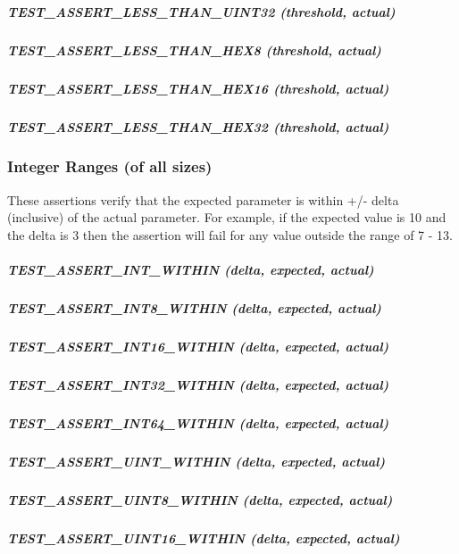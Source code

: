 \subparagraph*{{\ttfamily T\+E\+S\+T\+\_\+\+A\+S\+S\+E\+R\+T\+\_\+\+L\+E\+S\+S\+\_\+\+T\+H\+A\+N\+\_\+\+U\+I\+N\+T32 (threshold, actual)}}

\subparagraph*{{\ttfamily T\+E\+S\+T\+\_\+\+A\+S\+S\+E\+R\+T\+\_\+\+L\+E\+S\+S\+\_\+\+T\+H\+A\+N\+\_\+\+H\+E\+X8 (threshold, actual)}}

\subparagraph*{{\ttfamily T\+E\+S\+T\+\_\+\+A\+S\+S\+E\+R\+T\+\_\+\+L\+E\+S\+S\+\_\+\+T\+H\+A\+N\+\_\+\+H\+E\+X16 (threshold, actual)}}

\subparagraph*{{\ttfamily T\+E\+S\+T\+\_\+\+A\+S\+S\+E\+R\+T\+\_\+\+L\+E\+S\+S\+\_\+\+T\+H\+A\+N\+\_\+\+H\+E\+X32 (threshold, actual)}}

\subsubsection*{Integer Ranges (of all sizes)}

These assertions verify that the {\ttfamily expected} parameter is within +/-\/ {\ttfamily delta} (inclusive) of the {\ttfamily actual} parameter. For example, if the expected value is 10 and the delta is 3 then the assertion will fail for any value outside the range of 7 -\/ 13.

\subparagraph*{{\ttfamily T\+E\+S\+T\+\_\+\+A\+S\+S\+E\+R\+T\+\_\+\+I\+N\+T\+\_\+\+W\+I\+T\+H\+IN (delta, expected, actual)}}

\subparagraph*{{\ttfamily T\+E\+S\+T\+\_\+\+A\+S\+S\+E\+R\+T\+\_\+\+I\+N\+T8\+\_\+\+W\+I\+T\+H\+IN (delta, expected, actual)}}

\subparagraph*{{\ttfamily T\+E\+S\+T\+\_\+\+A\+S\+S\+E\+R\+T\+\_\+\+I\+N\+T16\+\_\+\+W\+I\+T\+H\+IN (delta, expected, actual)}}

\subparagraph*{{\ttfamily T\+E\+S\+T\+\_\+\+A\+S\+S\+E\+R\+T\+\_\+\+I\+N\+T32\+\_\+\+W\+I\+T\+H\+IN (delta, expected, actual)}}

\subparagraph*{{\ttfamily T\+E\+S\+T\+\_\+\+A\+S\+S\+E\+R\+T\+\_\+\+I\+N\+T64\+\_\+\+W\+I\+T\+H\+IN (delta, expected, actual)}}

\subparagraph*{{\ttfamily T\+E\+S\+T\+\_\+\+A\+S\+S\+E\+R\+T\+\_\+\+U\+I\+N\+T\+\_\+\+W\+I\+T\+H\+IN (delta, expected, actual)}}

\subparagraph*{{\ttfamily T\+E\+S\+T\+\_\+\+A\+S\+S\+E\+R\+T\+\_\+\+U\+I\+N\+T8\+\_\+\+W\+I\+T\+H\+IN (delta, expected, actual)}}

\subparagraph*{{\ttfamily T\+E\+S\+T\+\_\+\+A\+S\+S\+E\+R\+T\+\_\+\+U\+I\+N\+T16\+\_\+\+W\+I\+T\+H\+IN (delta, expected, actual)}}

